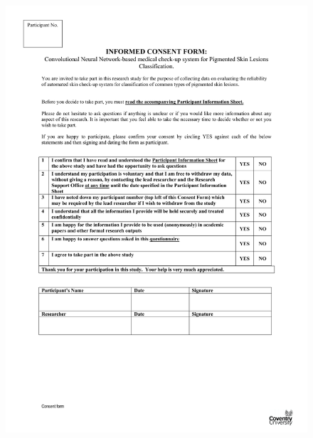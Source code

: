\section*{}
\begin{figure}[!htp]
    \centering
    \includegraphics[width=\textwidth]{Documents/consent.pdf}
\end{figure}

